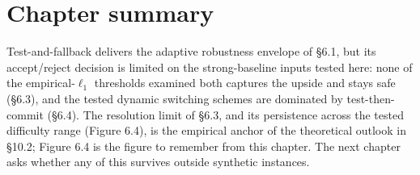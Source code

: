 \section{Chapter summary}

Test-and-fallback delivers the adaptive robustness envelope of §6.1, but
its accept/reject decision is limited on the strong-baseline inputs
tested here: none of the empirical-\(\ell_1\) thresholds examined both
captures the upside and stays safe (§6.3), and the tested dynamic
switching schemes are dominated by test-then-commit (§6.4). The
resolution limit of §6.3, and its persistence across the tested
difficulty range (Figure 6.4), is the empirical anchor of the
theoretical outlook in §10.2; Figure 6.4 is the figure to remember from
this chapter. The next chapter asks whether any of this survives outside
synthetic instances.
